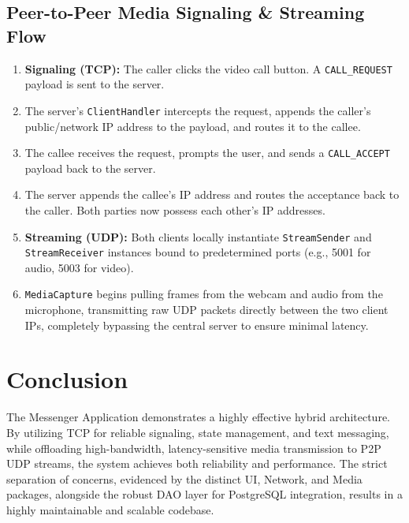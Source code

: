 \documentclass[12pt,a4paper]{article}
\begin{document}
\subsection{Peer-to-Peer Media Signaling \& Streaming Flow}
\begin{enumerate}
    \item \textbf{Signaling (TCP):} The caller clicks the video call button. A \texttt{CALL\_REQUEST} payload is sent to the server.
    \item The server's \texttt{ClientHandler} intercepts the request, appends the caller's public/network IP address to the payload, and routes it to the callee.
    \item The callee receives the request, prompts the user, and sends a \texttt{CALL\_ACCEPT} payload back to the server.
    \item The server appends the callee's IP address and routes the acceptance back to the caller. Both parties now possess each other's IP addresses.
    \item \textbf{Streaming (UDP):} Both clients locally instantiate \texttt{StreamSender} and \texttt{StreamReceiver} instances bound to predetermined ports (e.g., 5001 for audio, 5003 for video).
    \item \texttt{MediaCapture} begins pulling frames from the webcam and audio from the microphone, transmitting raw UDP packets directly between the two client IPs, completely bypassing the central server to ensure minimal latency.
\end{enumerate}

\section{Conclusion}
The Messenger Application demonstrates a highly effective hybrid architecture. By utilizing TCP for reliable signaling, state management, and text messaging, while offloading high-bandwidth, latency-sensitive media transmission to P2P UDP streams, the system achieves both reliability and performance. The strict separation of concerns, evidenced by the distinct UI, Network, and Media packages, alongside the robust DAO layer for PostgreSQL integration, results in a highly maintainable and scalable codebase.
\end{document}

